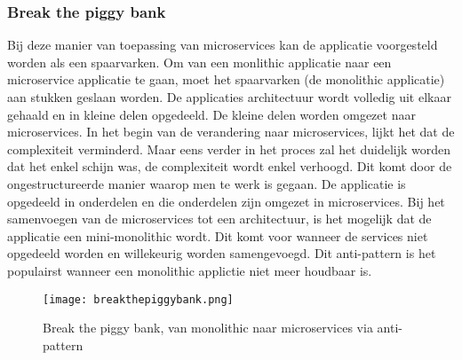 \subsubsection{Break the piggy bank}
Bij deze manier van toepassing van microservices kan de applicatie voorgesteld worden als een spaarvarken. Om van een monlithic applicatie naar een microservice applicatie te gaan, moet het spaarvarken (de monolithic applicatie) aan stukken geslaan worden. De applicaties architectuur wordt volledig uit elkaar gehaald en in kleine delen opgedeeld. De kleine delen worden omgezet naar microservices. In het begin van de verandering naar microservices, lijkt het dat de complexiteit verminderd. Maar eens verder in het proces zal het duidelijk worden dat het enkel schijn was, de complexiteit wordt enkel verhoogd. Dit komt door de ongestructureerde manier waarop men te werk is gegaan.
De applicatie is opgedeeld in onderdelen en die onderdelen zijn omgezet in microservices. Bij het samenvoegen van de microservices tot een architectuur, is het mogelijk dat de applicatie een mini-monolithic wordt. Dit komt voor wanneer de services niet opgedeeld worden en willekeurig worden samengevoegd.
Dit anti-pattern is het populairst wanneer een monolithic applictie niet meer houdbaar is. 
\begin{figure}[h!]
	\texttt{[image: breakthepiggybank.png]}
	\centering
	\caption{Break the piggy bank, van monolithic naar microservices via anti-pattern \textcite{Monson2019}}
\end{figure}

